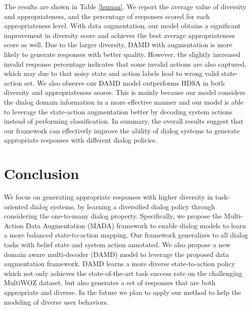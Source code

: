 \documentclass[letterpaper]{article} \usepackage{aaai20}  \usepackage{times}  \usepackage{helvet} \usepackage{courier}  \usepackage[hyphens]{url}  \usepackage{graphicx} \urlstyle{rm} \def\UrlFont{\rm}  \usepackage{graphicx}  \frenchspacing  \setlength{\pdfpagewidth}{8.5in}  \setlength{\pdfpageheight}{11in}  \usepackage{multirow}
\begin{document}
	The results are shown in Table \ref{human}. We report the average value of diversity and appropriateness, and the percentage of responses scored for each appropriateness level. With data augmentation, our model obtains a significant improvement in diversity score and achieves the best average appropriateness score as well. Due to the larger diversity, DAMD with augmentation is more likely to generate responses with better quality. However, the slightly increased invalid response percentage indicates that some invalid actions are also captured, which may due to that noisy state and action labels lead to wrong valid state-action set. We also observe our DAMD model outperforms HDSA in both diversity and appropriateness scores. This is mainly because our model considers the dialog domain information in a more effective manner and our model is able to leverage the state-action augmentation better by decoding system actions instead of performing classification. 
	In summary, the overall results suggest that our framework can effectively improve the ability of dialog systems to generate appropriate responses with different dialog policies.  
	
	\begin{table}[h]
		\small
		\centering
		\caption{Human evaluation results. Models with data augmentation are noted as (+). App denotes the average appropriateness score.  }
		\label{human} 
	\end{table}
	
	
	\section{Conclusion}
	We focus on generating appropriate responses with higher diversity in task-oriented dialog systems, by learning a diversified dialog policy through considering the one-to-many dialog property. Specifically, we propose the Multi-Action Data Augmentation (MADA) framework to enable dialog models to learn a more balanced state-to-action mapping. Our framework generalizes to all dialog tasks with belief state and system action annotated. We also propose a new 
	domain aware multi-decoder (DAMD) model to leverage the proposed data augmentation framework. DAMD learns a more diverse state-to-action policy which not only achieves the state-of-the-art task success rate on the challenging MultiWOZ dataset, but also generates a set of responses that are both appropriate and diverse. In the future we plan to apply our method to help the modeling of diverse user behaviors.
	
	
	
	


	
	
	\fontsize{9.0pt}{10.0pt} \selectfont
	
	
	
\end{document}
